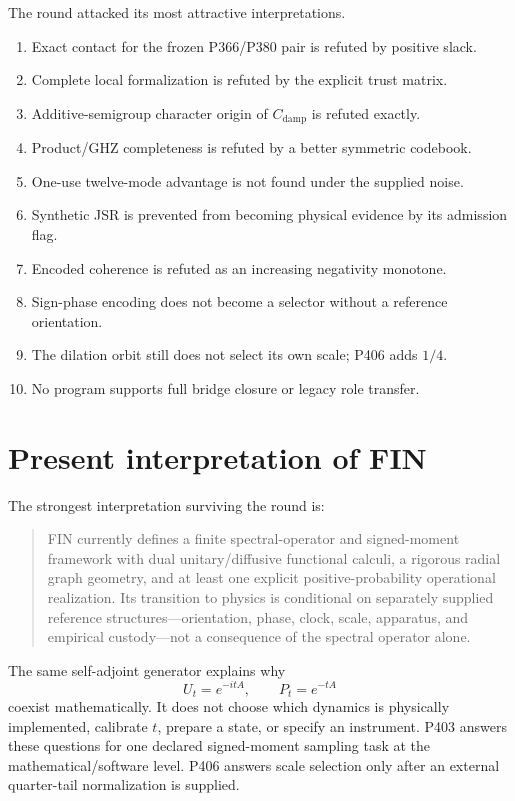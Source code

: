 \documentclass[11pt,a4paper,openany]{report}
\begin{document}
The round attacked its most attractive interpretations.
\begin{enumerate}
\item Exact contact for the frozen P366/P380 pair is refuted by positive slack.
\item Complete local formalization is refuted by the explicit trust matrix.
\item Additive-semigroup character origin of $C_{\mathrm{damp}}$ is refuted exactly.
\item Product/GHZ completeness is refuted by a better symmetric codebook.
\item One-use twelve-mode advantage is not found under the supplied noise.
\item Synthetic JSR is prevented from becoming physical evidence by its admission flag.
\item Encoded coherence is refuted as an increasing negativity monotone.
\item Sign-phase encoding does not become a selector without a reference orientation.
\item The dilation orbit still does not select its own scale; P406 adds $1/4$.
\item No program supports full bridge closure or legacy role transfer.
\end{enumerate}

\chapter{Present interpretation of FIN}

The strongest interpretation surviving the round is:

\begin{quote}
FIN currently defines a finite spectral-operator and signed-moment framework
with dual unitary/diffusive functional calculi, a rigorous radial graph
geometry, and at least one explicit positive-probability operational
realization. Its transition to physics is conditional on separately supplied
reference structures---orientation, phase, clock, scale, apparatus, and
empirical custody---not a consequence of the spectral operator alone.
\end{quote}

The same self-adjoint generator explains why
\[
U_t=e^{-itA},\qquad P_t=e^{-tA}
\]
coexist mathematically. It does not choose which dynamics is physically
implemented, calibrate $t$, prepare a state, or specify an instrument. P403
answers these questions for one declared signed-moment sampling task at the
mathematical/software level. P406 answers scale selection only after an
external quarter-tail normalization is supplied.
\end{document}

